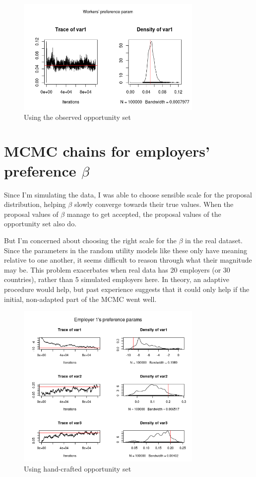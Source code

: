 \documentclass[12pt]{article}
\begin{document}
\begin{figure}[!ht]
\centering
\includegraphics[width=0.8\textwidth]{../figure/worker_alpha_obs_opp}
\caption{Using the observed opportunity set}
\end{figure}

\FloatBarrier
\section{MCMC chains for employers' preference $\beta$}

Since I'm simulating the data, I was able to choose sensible scale for the
proposal distribution, helping $\beta$ slowly converge towards their true
values. When the proposal values of $\beta$ manage to get accepted, the proposal
values of the opportunity set also do.

But I'm concerned about choosing the right scale for the $\beta$ in the real
dataset. Since the parameters in the random utility models like these only have
meaning relative to one another, it seems difficult to reason through what their magnitude
may be. This problem exacerbates when real data has 20 employers (or 30
countries), rather than 5 simulated employers here. In theory, an adaptive procedure would help, but past
experience suggests that it could only help if the initial, non-adapted part of
the MCMC went well.

\begin{figure}[!ht]
\centering
\includegraphics[width=0.8\textwidth]{../figure/employer1_beta_starting_opp}
\caption{Using hand-crafted opportunity set}
\end{figure}
\end{document}
